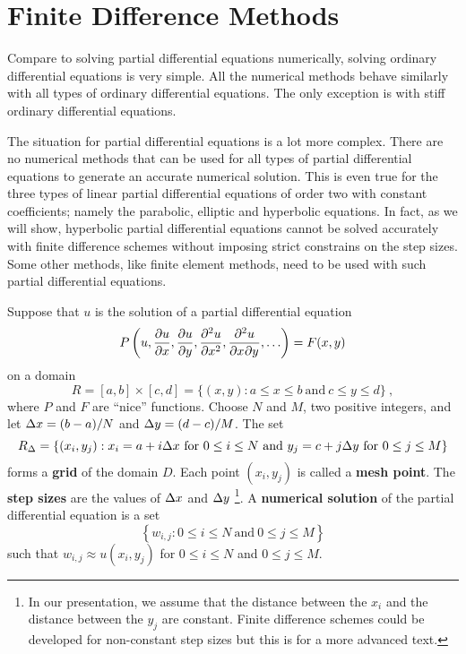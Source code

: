\chapter{Finite Difference Methods}\label{FiniteDiffMeth}

Compare to solving partial differential equations numerically,
solving ordinary differential equations is very simple.  All the
numerical methods behave similarly with all types of ordinary
differential equations.  The only exception is with stiff ordinary
differential equations.

The situation for partial differential equations is a lot more
complex.  There are no numerical methods that can be used for all
types of partial differential equations to generate an accurate
numerical solution.  This is even true for the three types of linear
partial differential equations of order two with constant
coefficients; namely the parabolic, elliptic and hyperbolic equations.
In fact, as we will show, hyperbolic partial differential equations
cannot be solved accurately with finite difference schemes without
imposing strict constrains on the step sizes.  Some other methods,
like finite element methods, need to be used with such partial
differential equations.

Suppose that $u$ is the solution of a partial differential equation
\[
P\left(u, \pdydx{u}{x}, \pdydx{u}{y}, \pdydxn{u}{x}{2},
\pdydxnm{u}{x}{y}{2}{}{},  \ldots \right)= F(x,y)
\]
on a domain
\[
R= [a,b] \times [c,d] = \{ (x,y) : a \leq x \leq b \ \text{and}
\ c \leq y \leq d \} \ ,
\]
where $P$ and $F$ are ``nice'' functions.  Choose $N$ and
$M$, two positive integers, and let $\dtx{x} = (b-a)/N$ and
$\dtx{y} = (d-c)/M$.  The set
\[
R_\Delta =
\left\{ (x_i,y_j) : x_i = a+i\dtx{x} \ \text{for} \ 0\leq i \leq N
\ \text{and} \ y_j = c + j\dtx{y} \ \text{for} \ 0\leq j \leq
M \right\}
\]
forms a {\bfseries grid} of the domain
$D$.  Each point $(x_i,y_j)$ is called a
{\bfseries mesh point}.  The
{\bfseries step sizes} are the
values of $\dtx{x}$ and $\dtx{y}$ \footnote{In our presentation, we
assume that the distance between the $x_i$ and the distance between
the $y_j$ are constant.  Finite difference schemes could be developed
for non-constant step sizes but this is for a more advanced text.}.
A {\bfseries numerical solution} of the partial differential equation is a set
\[
\left\{ w_{i,j} : 0\leq i \leq N \ \text{and} \ 0\leq j \leq M \right\}
\]
such that $w_{i,j} \approx u(x_i,y_j)$ for $0\leq i \leq N$ and
$0\leq j \leq M$.

